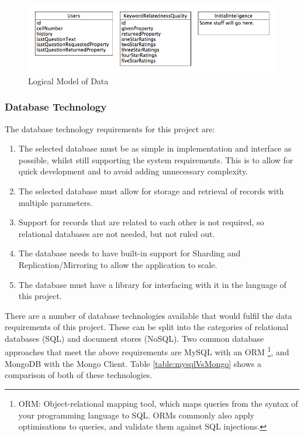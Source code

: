 \documentclass[authoryearcitations]{UoYCSproject}
\begin{document}
\begin{figure}[htb] 
\includegraphics[width=\linewidth]{logicalModel}
\caption{Logical Model of Data}
\label{fig:logicalDatabaseDesignDiagram}
\end{figure}

\subsubsection{Database Technology}
The database technology requirements for this project are:

\begin{enumerate}
  \item The selected database must be as simple in implementation and interface as possible, whilst still supporting the system requirements.  This is to allow for quick development and to avoid adding unnecessary complexity.
  \item The selected database must allow for storage and retrieval of records with multiple parameters.
  \item Support for records that are related to each other is not required, so relational databases are not needed, but not ruled out.
  \item The database needs to have built-in support for Sharding and Replication/Mirroring to allow the application to scale.
  \item The database must have a library for interfacing with it in the language of this project.
\end{enumerate}

There are a number of database technologies available that would fulfil the data requirements of this project.  These can be split into the categories of relational databases (SQL) and document stores (NoSQL).  Two common database approaches that meet the above requirements are MySQL with an ORM \footnote{ORM: Object-relational mapping tool, which maps queries from the syntax of your programming language to SQL.  ORMs commonly also apply optimisations to queries, and validate them against SQL injections.}, and MongoDB with the Mongo Client.  Table \ref{table:mysqlVsMongo} shows a comparison of both of these technologies.
\end{document}
